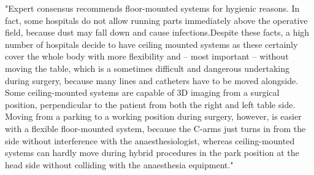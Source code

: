 	"Expert consensus recommends floor-mounted systems for hygienic reasons. In fact, some hospitals do not allow running parts immediately above the operative field, because dust may fall down and cause infections.Despite these facts, a high number of hospitals decide to have ceiling mounted systems as these certainly cover the whole body with more flexibility and – most important – without moving the table, which is a sometimes difficult and dangerous undertaking during surgery, because many lines and catheters have to be moved alongside.  Some ceiling-mounted systems are capable of 3D imaging from a surgical position, perpendicular to the patient from both the right and left table side. Moving from a parking to a working position during surgery, however, is easier with a flexible floor-mounted system, because the C-arms just turns in from the side without interference with the anaesthesiologist, whereas ceiling-mounted systems can hardly move during hybrid procedures in the park position at the head side without colliding with the anaesthesia equipment."